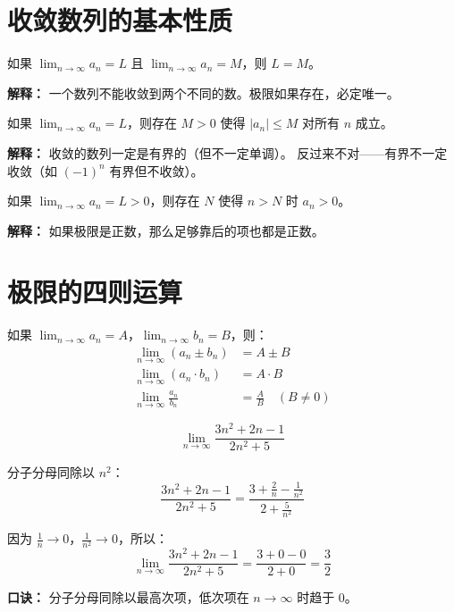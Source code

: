 \section{收敛数列的基本性质}

\begin{theorembox}[极限的唯一性]
如果 \(\displaystyle\lim_{n\to\infty} a_n = L\) 且 \(\displaystyle\lim_{n\to\infty} a_n = M\)，则 \(L = M\)。

\textbf{解释：} 一个数列不能收敛到两个不同的数。极限如果存在，必定唯一。
\end{theorembox}

\begin{theorembox}[收敛数列必有界]
如果 \(\displaystyle\lim_{n\to\infty} a_n = L\)，则存在 \(M > 0\) 使得 \(|a_n| \le M\) 对所有 \(n\) 成立。

\textbf{解释：} 收敛的数列一定是有界的（但不一定单调）。
反过来不对——有界不一定收敛（如 \((-1)^n\) 有界但不收敛）。
\end{theorembox}

\begin{theorembox}[极限的保号性]
如果 \(\displaystyle\lim_{n\to\infty} a_n = L > 0\)，则存在 \(N\) 使得 \(n > N\) 时 \(a_n > 0\)。

\textbf{解释：} 如果极限是正数，那么足够靠后的项也都是正数。
\end{theorembox}


\section{极限的四则运算}

\begin{theorembox}[极限的四则运算法则]
如果 \(\displaystyle\lim_{n\to\infty} a_n = A\)，\(\displaystyle\lim_{n\to\infty} b_n = B\)，则：
\begin{align*}
  \lim_{n\to\infty} (a_n \pm b_n) &= A \pm B \\
  \lim_{n\to\infty} (a_n \cdot b_n) &= A \cdot B \\
  \lim_{n\to\infty} \frac{a_n}{b_n} &= \frac{A}{B} \quad (B \neq 0)
\end{align*}
\end{theorembox}

\begin{examplebox}[6——用四则运算法则求极限]
\[
\lim_{n\to\infty} \frac{3n^2 + 2n - 1}{2n^2 + 5}
\]

分子分母同除以 \(n^2\)：
\[
\frac{3n^2 + 2n - 1}{2n^2 + 5} = \frac{3 + \frac{2}{n} - \frac{1}{n^2}}{2 + \frac{5}{n^2}}
\]

因为 \(\frac{1}{n} \to 0\)，\(\frac{1}{n^2} \to 0\)，所以：
\[
\lim_{n\to\infty} \frac{3n^2 + 2n - 1}{2n^2 + 5} = \frac{3 + 0 - 0}{2 + 0} = \frac{3}{2}
\]

\textbf{口诀：} 分子分母同除以最高次项，低次项在 \(n\to\infty\) 时趋于 0。
\end{examplebox}


